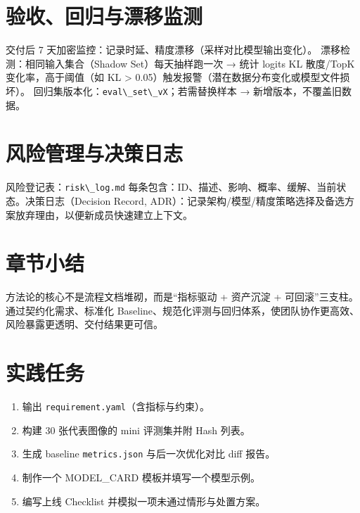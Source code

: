 \section{验收、回归与漂移监测}\label{ux9a8cux6536ux56deux5f52ux4e0eux6f02ux79fbux76d1ux6d4b}

交付后 7 天加密监控：记录时延、精度漂移（采样对比模型输出变化）。
漂移检测：相同输入集合（Shadow Set）每天抽样跑一次 → 统计 logits KL
散度/TopK 变化率，高于阈值（如 KL \textgreater{}
0.05）触发报警（潜在数据分布变化或模型文件损坏）。
回归集版本化：\passthrough{\lstinline!eval\_set\_vX!}；若需替换样本 →
新增版本，不覆盖旧数据。

\section{风险管理与决策日志}\label{ux98ceux9669ux7ba1ux7406ux4e0eux51b3ux7b56ux65e5ux5fd7}

风险登记表：\passthrough{\lstinline!risk\_log.md!}
每条包含：ID、描述、影响、概率、缓解、当前状态。决策日志（Decision
Record,
ADR）：记录架构/模型/精度策略选择及备选方案放弃理由，以便新成员快速建立上下文。

\section{章节小结}\label{ux7ae0ux8282ux5c0fux7ed3}

方法论的核心不是流程文档堆砌，而是``指标驱动 + 资产沉淀 +
可回滚''三支柱。通过契约化需求、标准化
Baseline、规范化评测与回归体系，使团队协作更高效、风险暴露更透明、交付结果更可信。

\section{实践任务}\label{ux5b9eux8df5ux4efbux52a1}

\begin{enumerate}
\def\labelenumi{\arabic{enumi}.}
\tightlist
\item
  输出 \passthrough{\lstinline!requirement.yaml!}（含指标与约束）。
\item
  构建 30 张代表图像的 mini 评测集并附 Hash 列表。
\item
  生成 baseline \passthrough{\lstinline!metrics.json!} 与后一次优化对比
  diff 报告。
\item
  制作一个 MODEL\_CARD 模板并填写一个模型示例。
\item
  编写上线 Checklist 并模拟一项未通过情形与处置方案。
\end{enumerate}
